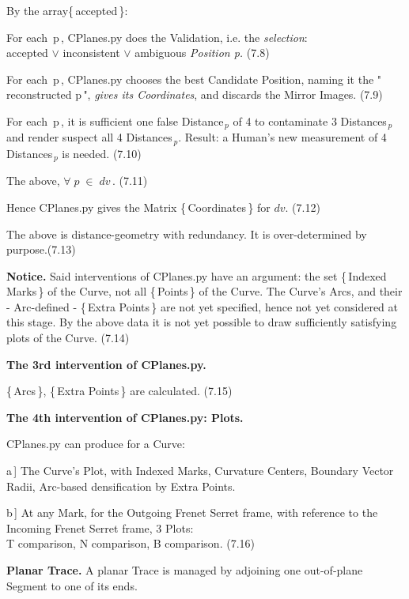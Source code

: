 \documentclass[12pt]{article} %
\begin{document}
{\noindent  By the array\{\,accepted\,\}:

\noindent For each \,p\,, CPlanes.py does the Validation, i.e. the \textsl{selection}:\\ accepted $\vee$ inconsistent $\vee$ ambiguous\; \textsl{Position p.}\; \;  (7.8)

\noindent For each\, p\,, CPlanes.py chooses the best Candidate Position, naming it the "\,reconstructed p\,", \textsl{gives its Coordinates}, and discards the Mirror Images. (7.9)

\noindent For each\, p\,, it is sufficient one false Distance$_{\,p}$ of 4 to contaminate 3 Distances$_{\,p}$ and render suspect all 4 Distances$_{\,p}$. Result: a Human's new measurement of 4 Distances$_{\,p}$ is needed. \qquad \qquad (7.10)

\noindent The above, $\forall\;p\;\in\;dv$\,. \qquad \qquad (7.11)

\noindent Hence CPlanes.py gives the  Matrix \{\,Coordinates\,\} for $dv$. (7.12)

\noindent The above is distance-geometry with redundancy. It is over-determined by purpose.\qquad \qquad (7.13) 

\noindent \textbf{Notice.} Said interventions of CPlanes.py have an argument: the set \{\,Indexed Marks\,\} of the Curve, not all \{\,Points\,\} of the Curve. The Curve's Arcs, and their - Arc-defined - \{\,Extra Points\,\} are not yet specified, hence not yet considered at this stage. By the above data it is not yet possible to draw sufficiently satisfying plots of the Curve. \qquad \qquad (7.14)

\noindent \textbf{The 3rd intervention of CPlanes.py.}

\noindent \{\,Arcs\,\}, \{\,Extra Points\,\} are calculated. \qquad \qquad (7.15)

\noindent \textbf{The 4th intervention of CPlanes.py: Plots.}

\noindent CPlanes.py can produce for a Curve:

\noindent a\,] The Curve's Plot, with Indexed Marks, Curvature Centers, Boundary Vector Radii, Arc-based densification by Extra Points.

\noindent b\,] At any Mark, for the Outgoing Frenet Serret frame, with reference to the Incoming Frenet Serret frame, 3 Plots:\\ T comparison, N comparison, B comparison. \qquad \qquad (7.16)    

\noindent \textbf{Planar Trace.} A planar Trace is managed by adjoining  one out-of-plane Segment to one of its ends. 

}
\end{document}
